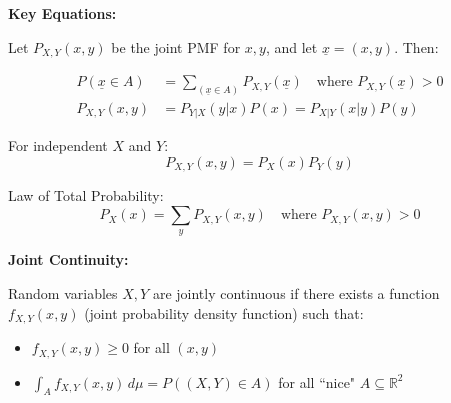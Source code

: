 \documentclass{article}
\begin{document}
    \vspace{0.3cm}
    \noindent
    \textbf{Key Equations:}
    
    Let $P_{X,Y}(x,y)$ be the joint PMF for $x,y$, and let $\underline{x} = (x,y)$. Then:


    \begin{align*}
        P(\underline{x} \in A) &= \sum_{(\underline{x} \in A)} P_{X,Y}(\underline{x}) \quad \text{where } P_{X,Y}(\underline{x}) > 0 \\[0.3cm]
        P_{X, Y}(x, y) &= P_{Y|X}(y|x)P(x) = P_{X|Y}(x|y)P(y)
    \end{align*}

    \noindent
    For independent $X$ and $Y$:
    \[
        P_{X,Y}(x,y) = P_X(x)P_Y(y)
    \]

    \noindent
    Law of Total Probability:
    \[
        P_X(x) = \sum_{y} P_{X,Y}(x,y) \quad \text{where } P_{X,Y}(x,y) > 0
    \]


    \vspace{0.3cm}
    \noindent
    \textbf{Joint Continuity:}
    
    Random variables $X,Y$ are jointly continuous if there exists a function $f_{X,Y}(x,y)$ (joint probability density function) such that:
    \begin{itemize}
        \item $f_{X,Y}(x,y) \geq 0$ for all $(x,y)$
        \item $\displaystyle \int_A f_{X,Y}(x,y) \, d\mu = P((X,Y) \in A)$ for all ``nice" $A \subseteq \mathbb{R}^2$
    \end{itemize}

    \pagebreak
\end{document}
